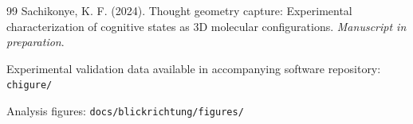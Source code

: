 \documentclass[12pt,a4paper]{article}
\begin{document}
\begin{thebibliography}{99}
Sachikonye, K. F. (2024).
Thought geometry capture: Experimental characterization of cognitive states as 3D molecular configurations.
\textit{Manuscript in preparation}.

Experimental validation data available in accompanying software repository: \texttt{chigure/}

Analysis figures: \texttt{docs/blickrichtung/figures/}

\end{thebibliography}
\end{document}
